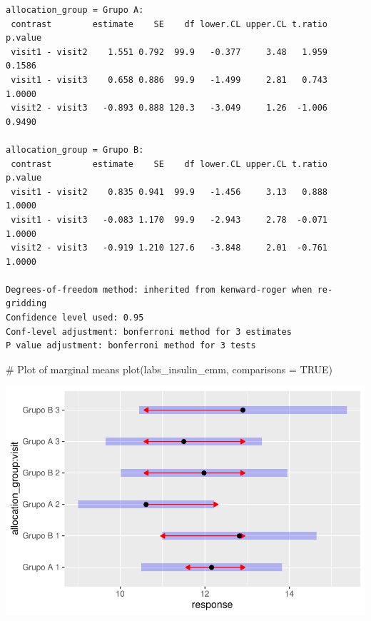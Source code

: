 \documentclass[
  letterpaper,
  DIV=11,
  numbers=noendperiod]{scrartcl}
\newenvironment{Shaded}{\begin{snugshade}}{\end{snugshade}}
\newcommand{\AttributeTok}[1]{\textcolor[rgb]{0.40,0.45,0.13}{#1}}
\newcommand{\CommentTok}[1]{\textcolor[rgb]{0.37,0.37,0.37}{#1}}
\newcommand{\ConstantTok}[1]{\textcolor[rgb]{0.56,0.35,0.01}{#1}}
\newcommand{\FunctionTok}[1]{\textcolor[rgb]{0.28,0.35,0.67}{#1}}
\newcommand{\NormalTok}[1]{\textcolor[rgb]{0.00,0.23,0.31}{#1}}
\begin{document}
\begin{verbatim}
allocation_group = Grupo A:
 contrast        estimate    SE    df lower.CL upper.CL t.ratio p.value
 visit1 - visit2    1.551 0.792  99.9   -0.377     3.48   1.959  0.1586
 visit1 - visit3    0.658 0.886  99.9   -1.499     2.81   0.743  1.0000
 visit2 - visit3   -0.893 0.888 120.3   -3.049     1.26  -1.006  0.9490

allocation_group = Grupo B:
 contrast        estimate    SE    df lower.CL upper.CL t.ratio p.value
 visit1 - visit2    0.835 0.941  99.9   -1.456     3.13   0.888  1.0000
 visit1 - visit3   -0.083 1.170  99.9   -2.943     2.78  -0.071  1.0000
 visit2 - visit3   -0.919 1.210 127.6   -3.848     2.01  -0.761  1.0000

Degrees-of-freedom method: inherited from kenward-roger when re-gridding 
Confidence level used: 0.95 
Conf-level adjustment: bonferroni method for 3 estimates 
P value adjustment: bonferroni method for 3 tests 
\end{verbatim}

\begin{Shaded}
\begin{Highlighting}[]
\CommentTok{\# Plot of marginal means}
\FunctionTok{plot}\NormalTok{(labs\_insulin\_emm, }\AttributeTok{comparisons =} \ConstantTok{TRUE}\NormalTok{)}
\end{Highlighting}
\end{Shaded}

\includegraphics{Outcomes_V1V2V3_files/figure-pdf/labs_insulin_sens_emm-1.pdf}
\end{document}

